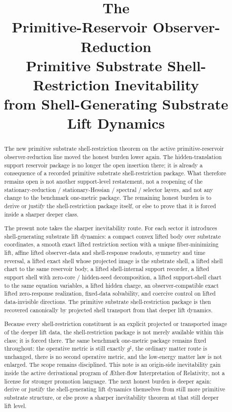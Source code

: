 \documentclass[11pt]{article}
\title{\textbf{The \TheoryName{}}\\[0.4em]
\large Primitive-Reservoir Observer-Reduction\\
\large Primitive Substrate Shell-Restriction Inevitability\\
\large from Shell-Generating Substrate Lift Dynamics}
\author{}
\date{}
\newcommand{\Aflow}{\AE{}ther-flow}
\newcommand{\TheoryName}{\Aflow{} Interpretation of Relativity}
\newcommand{\CompletedMetric}{g^{\sharp}}
\begin{document}
\maketitle

\begin{abstract}
The new primitive substrate shell-restriction theorem on the active primitive-reservoir observer-reduction line moved the honest burden lower again. The hidden-translation support reservoir package is no longer the open insertion there; it is already a consequence of a recorded primitive substrate shell-restriction package. What therefore remains open is not another support-level restatement, not a reopening of the stationary-reduction / stationary-Hessian / spectral / selector layers, and not any change to the benchmark one-metric package. The remaining honest burden is to derive or justify the shell-restriction package itself, or else to prove that it is forced inside a sharper deeper class.

The present note takes the sharper inevitability route. For each sector it introduces shell-generating substrate lift dynamics: a compact convex lifted body over substrate coordinates, a smooth exact lifted restriction section with a unique fiber-minimizing lift, affine lifted observer-data and shell-response readouts, symmetry and time reversal, a lifted exact shell whose projected image is the substrate shell, a lifted shell chart to the same reservoir body, a lifted shell-internal support recorder, a lifted support shell with zero-core / hidden-seed decomposition, a lifted support-shell chart to the same equation variables, a lifted hidden charge, an observer-compatible exact lifted zero-response realization, fixed-data solvability, and coercive control on lifted data-invisible directions. The primitive substrate shell-restriction package is then recovered canonically by projected shell transport from that deeper lift dynamics.

Because every shell-restriction constituent is an explicit projected or transported image of the deeper lift data, the shell-restriction package is not merely available within this class; it is forced there. The same benchmark one-metric package remains fixed throughout: the operative metric is still exactly \(\CompletedMetric\), the ordinary matter route is unchanged, there is no second operative metric, and the low-energy matter law is not enlarged. The scope remains disciplined. This note is an origin-side inevitability gain inside the active derivational program of \TheoryName{}, not a license for stronger promotion language. The next honest burden is deeper again: derive or justify the shell-generating lift dynamics themselves from still more primitive substrate structure, or else prove a sharper inevitability theorem at that still deeper lift level.
\end{abstract}
\end{document}
